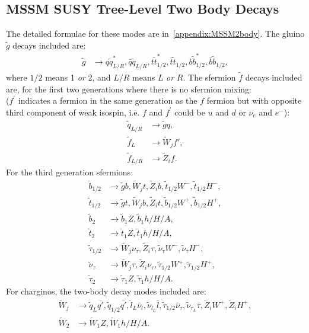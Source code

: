\documentclass[final,3p,times,pdflatex]{elsarticle}
\begin{document}
\subsection{MSSM SUSY Tree-Level Two Body Decays}
The detailed formulae for these modes are in~\ref{appendix:MSSM2body}.
The gluino $\tilde{g}$ decays included are:
\begin{align*}
\tilde{g} &\rightarrow q \tilde{q}_{L/R}^* , \bar{q} \tilde{q}_{L/R}, t \tilde{t}_{1/2}^*, \bar{t} \tilde{t}_{1/2},
b \tilde{b}_{1/2}^*, \bar{b} \tilde{b}_{1/2},
\end{align*}
where $1/2$ means 1 {\em or}\/ 2, and $L/R$ means $L$ {\em or} $R$.
The sfermion $\tilde{f}$ decays included are, for the first two generations
where there is no sfermion mixing: \\ ($f^{'}$ indicates a fermion in the same
generation as the $f$ fermion but with opposite third component of weak
isospin, i.e. $f$ and $f^{'}$ could be $u$ and $d$ or $\nu_{e}$ and $e^{-}$): 
\begin{align*}
\tilde{q}_{L/R} &\rightarrow \tilde{g} q, \\
\tilde{f}_{L} &\rightarrow \tilde{W}_{j} f', \\
\tilde{f}_{L/R} &\rightarrow \tilde{Z}_{i} f.
\end{align*}
For the third generation sfermions:
\begin{align*}
\tilde{b}_{1/2} &\rightarrow \tilde{g} b, \tilde{W}_{j} t, \tilde{Z}_{i} b, \tilde{t}_{1/2} W^-, \tilde{t}_{1/2} H^-, \\
\tilde{t}_{1/2} &\rightarrow \tilde{g} t, \tilde{W}_{j} b, \tilde{Z}_{i} t, \tilde{b}_{1/2} W^+, \tilde{b}_{1/2} H^+,\\
\tilde{b}_{2} &\rightarrow \tilde{b}_{1} Z, \tilde{b}_{1} h/H/A, \\
\tilde{t}_{2} &\rightarrow \tilde{t}_{1} Z, \tilde{t}_{1} h/H/A, \\
\tilde{\tau}_{1/2} &\rightarrow \tilde{W}_{j} \nu_{\tau}, \tilde{Z}_{i} \tau, \tilde{\nu}_{\tau} W^-, \tilde{\nu}_{\tau} H^-, \\
\tilde{\nu}_{\tau} &\rightarrow \tilde{W}_{j} \tau, \tilde{Z}_{i} \nu_{\tau},
                     \tilde{\tau}_{1/2} W^+, \tilde{\tau}_{1/2} H^+, \\
\tilde{\tau}_{2} &\rightarrow \tilde{\tau}_{1} Z, \tilde{\tau}_{1} h/H/A. 
\end{align*}
For charginos, the two-body decay modes included are:
\begin{align*}
\tilde{W}_{j} &\rightarrow \tilde{q}_L \bar{q'}, \tilde{q}_{1/2} \bar{q'}, \tilde{l}_L \bar{\nu}_{l}, \tilde{\nu}_{{l}_{L}} \bar{l}, \tilde{\tau}_{1/2} \bar{\nu}_{\tau}, \tilde{\nu}_{{\tau}_{L}} \bar{\tau},  \tilde{Z}_{i} W^+, \tilde{Z}_{i} H^+,
\\
\tilde{W}_{2} &\rightarrow \tilde{W}_{1} Z, \tilde{W}_{1} h/H/A.
\end{align*}
\end{document}

